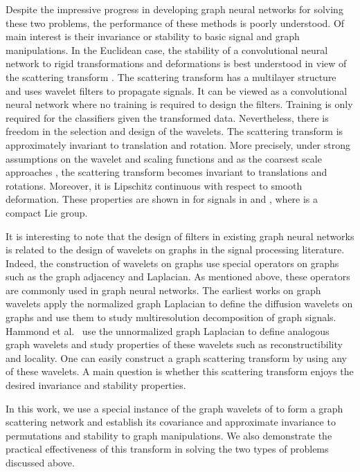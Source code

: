 \documentclass{article}
\begin{document}
Despite the impressive progress in developing graph neural networks for solving these two problems, the performance of these methods is poorly understood. Of main interest is their invariance or stability to basic signal and graph manipulations. In the Euclidean case, the stability of a convolutional neural network \cite{GooBC16} to {rigid transformations and deformations} is best understood in view of the scattering transform \cite{Mal13}. The scattering transform has a multilayer structure and uses wavelet filters to propagate signals. It can be viewed as a convolutional neural network where no training is required to design the filters. Training is only required for the classifiers given the transformed data. Nevertheless, there is freedom in the selection and design of the wavelets. 
The scattering transform is approximately invariant to translation and rotation. More precisely, under strong assumptions on the wavelet and scaling functions and as the coarsest scale  approaches , the scattering transform becomes invariant to translations and rotations. Moreover, it is Lipschitz continuous with respect to smooth deformation. These properties are shown in \cite{Mal13} for signals in  and , where  is a compact Lie group. 

It is interesting to note that the design of filters in existing graph neural networks is related to the design of wavelets on graphs in the signal processing literature. Indeed, the construction of wavelets on graphs use special operators on graphs such as the graph adjacency and Laplacian. As mentioned above, these operators are commonly used in graph neural networks.
The earliest works on graph wavelets \cite{CoiM06,MahM06} apply the normalized graph Laplacian to define the diffusion wavelets on graphs and use them to study multiresolution decomposition of graph signals. Hammond et al.~\cite{HamVG11} use the unnormalized graph Laplacian to define analogous graph wavelets and study properties of these wavelets such as reconstructibility and locality. One can easily construct a graph scattering transform by using any of these wavelets. A main question is whether this scattering transform enjoys the desired invariance and stability properties. 

In this work, we use a special instance of the graph wavelets of \cite{HamVG11} to form a graph scattering network and establish its covariance and approximate invariance to permutations and stability to graph manipulations. We also demonstrate the practical effectiveness of this transform in solving the two types of problems discussed above.
\end{document}
